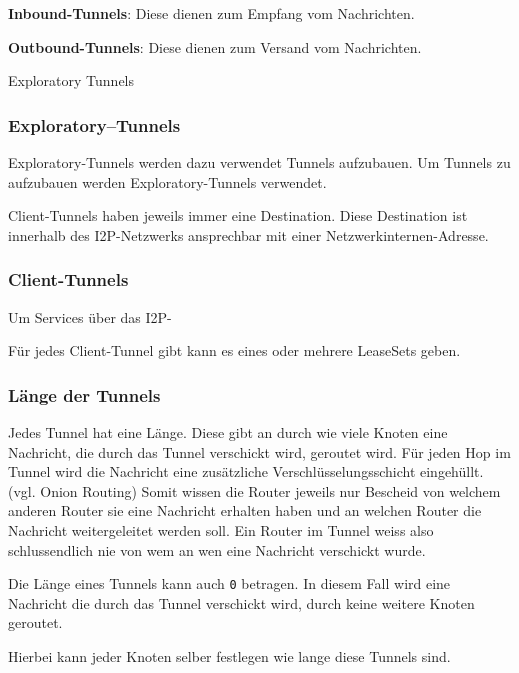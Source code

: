     \item \textbf{Inbound-Tunnels}: Diese dienen zum Empfang vom Nachrichten.
    \item \textbf{Outbound-Tunnels}: Diese dienen zum Versand vom Nachrichten.
    \item Exploratory Tunnels

\cite{noauthor_intro_nodate}

\subsubsection{Exploratory--Tunnels}

Exploratory-Tunnels werden dazu verwendet Tunnels aufzubauen.
Um Tunnels zu aufzubauen werden Exploratory-Tunnels verwendet.

Client-Tunnels haben jeweils immer eine Destination. Diese Destination ist innerhalb des I2P-Netzwerks ansprechbar mit einer Netzwerkinternen-Adresse.

\cite{de_boer_invisible_2019}

\subsubsection{Client-Tunnels}

Um Services über das I2P-

Für jedes Client-Tunnel gibt kann es eines oder mehrere LeaseSets geben.



\subsubsection{Länge der Tunnels}

Jedes Tunnel hat eine Länge.
Diese gibt an durch wie viele Knoten eine Nachricht, die durch das Tunnel verschickt wird, geroutet wird.
Für jeden Hop im Tunnel wird die Nachricht eine zusätzliche Verschlüsselungsschicht eingehüllt. (vgl. Onion Routing)
Somit wissen die Router jeweils nur Bescheid von welchem anderen Router sie eine Nachricht erhalten haben und an welchen Router die Nachricht weitergeleitet werden soll.
Ein Router im Tunnel weiss also schlussendlich nie von wem an wen eine Nachricht verschickt wurde.

Die Länge eines Tunnels kann auch \lstinline|0| betragen.
In diesem Fall wird eine Nachricht die durch das Tunnel verschickt wird, durch keine weitere Knoten geroutet.

Hierbei kann jeder Knoten selber festlegen wie lange diese Tunnels sind.

